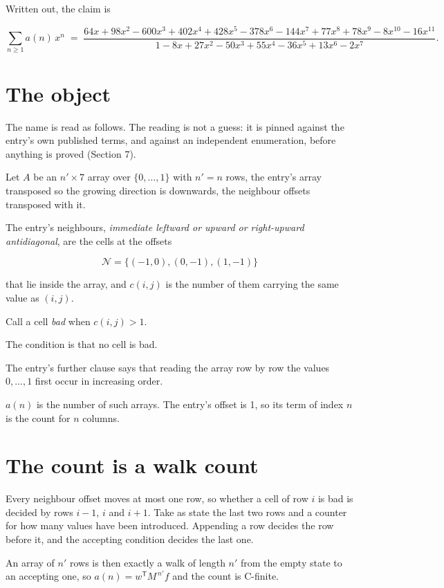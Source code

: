\documentclass[11pt]{article}
\theoremstyle{definition}
\begin{document}
Written out, the claim is

\[\sum_{n \ge 1} a(n)\,x^n \;=\; \frac{64x + 98x^{2} - 600x^{3} + 402x^{4} + 428x^{5} - 378x^{6} - 144x^{7} + 77x^{8} + 78x^{9} - 8x^{10} - 16x^{11}}{1 - 8x + 27x^{2} - 50x^{3} + 55x^{4} - 36x^{5} + 13x^{6} - 2x^{7}}.\]

\section{The object}

The name is read as follows. The reading is not a guess: it is pinned against the entry's own published terms, and against an independent enumeration, before anything is proved (Section 7).

Let $A$ be an $n' \times 7$ array over $\{0,\dots,1\}$ with $n' = n$ rows, the entry's array transposed so the growing direction is downwards, the neighbour offsets transposed with it.

The entry's neighbours, {\itshape immediate leftward or upward or right-upward antidiagonal}, are the cells at the offsets

\[\mathcal{N} = \{(-1,0), (0,-1), (1,-1)\}\]

that lie inside the array, and $c(i,j)$ is the number of them carrying the same value as $(i,j)$.

Call a cell {\itshape bad} when $c(i,j) > 1$.

The condition is that no cell is bad.

The entry's further clause says that reading the array row by row the values $0,\dots,1$ first occur in increasing order.

$a(n)$ is the number of such arrays. The entry's offset is 1, so its term of index $n$ is the count for $n$ columns.

\section{The count is a walk count}

Every neighbour offset moves at most one row, so whether a cell of row $i$ is bad is decided by rows $i-1$, $i$ and $i+1$. Take as state the last two rows and a counter for how many values have been introduced. Appending a row decides the row before it, and the accepting condition decides the last one.

An array of $n'$ rows is then exactly a walk of length $n'$ from the empty state to an accepting one, so $a(n) = w^{\mathsf T}M^{\,n'}f$ and the count is C-finite.
\end{document}
